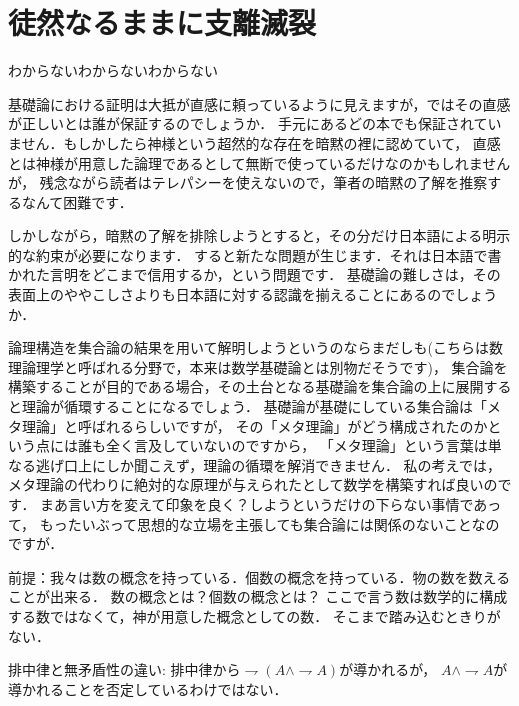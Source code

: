 \section{徒然なるままに支離滅裂}
わからないわからないわからない

基礎論における証明は大抵が直感に頼っているように見えますが，ではその直感が正しいとは誰が保証するのでしょうか．
手元にあるどの本でも保証されていません．もしかしたら神様という超然的な存在を暗黙の裡に認めていて，
直感とは神様が用意した論理であるとして無断で使っているだけなのかもしれませんが，
残念ながら読者はテレパシーを使えないので，筆者の暗黙の了解を推察するなんて困難です．

しかしながら，暗黙の了解を排除しようとすると，その分だけ日本語による明示的な約束が必要になります．
すると新たな問題が生じます．それは日本語で書かれた言明をどこまで信用するか，という問題です．
基礎論の難しさは，その表面上のややこしさよりも日本語に対する認識を揃えることにあるのでしょうか．

論理構造を集合論の結果を用いて解明しようというのならまだしも(こちらは数理論理学と呼ばれる分野で，本来は数学基礎論とは別物だそうです)，
集合論を構築することが目的である場合，その土台となる基礎論を集合論の上に展開すると理論が循環することになるでしょう．
基礎論が基礎にしている集合論は「メタ理論」と呼ばれるらしいですが，
その「メタ理論」がどう構成されたのかという点には誰も全く言及していないのですから，
「メタ理論」という言葉は単なる逃げ口上にしか聞こえず，理論の循環を解消できません．
私の考えでは，メタ理論の代わりに絶対的な原理が与えられたとして数学を構築すれば良いのです．
まあ言い方を変えて印象を良く？しようというだけの下らない事情であって，
もったいぶって思想的な立場を主張しても集合論には関係のないことなのですが．

前提：我々は数の概念を持っている．個数の概念を持っている．物の数を数えることが出来る．
数の概念とは？個数の概念とは？
ここで言う数は数学的に構成する数ではなくて，神が用意した概念としての数．
そこまで踏み込むときりがない．

排中律と無矛盾性の違い:
排中律から$\rightharpoondown (A \wedge \rightharpoondown A)$が導かれるが，
$A \wedge \rightharpoondown A$が導かれることを否定しているわけではない．